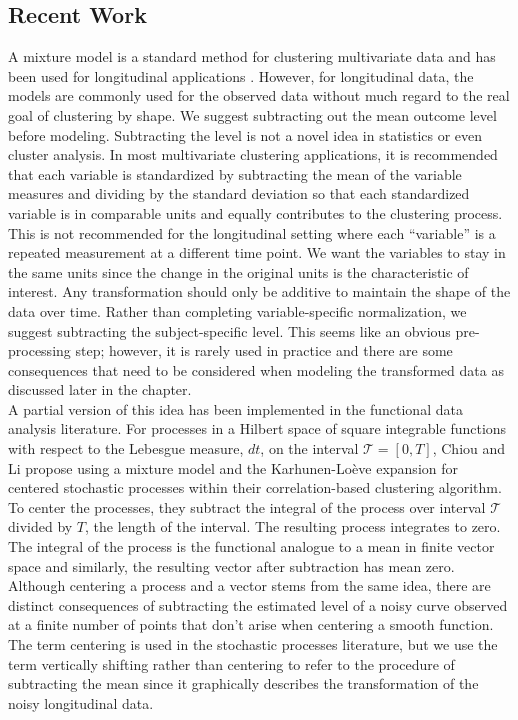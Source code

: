 \documentclass[12pt]{article}
\begin{document}
\subsection{Recent Work}
A mixture model is a standard method for clustering multivariate data \cite{everitt2009} and has been used for longitudinal applications \cite{muthen2010, jones2001}. However, for longitudinal data, the models are commonly used for the observed data without much regard to the real goal of clustering by shape. We suggest subtracting out the mean outcome level before modeling. Subtracting the level is not a novel idea in statistics or even cluster analysis. In most multivariate clustering applications, it is recommended that each variable is standardized by subtracting the mean of the variable measures and dividing by the standard deviation so that each standardized variable is in comparable units and equally contributes to the clustering process. This is not recommended for the longitudinal setting where each ``variable'' is a repeated measurement at a different time point. We want the variables to stay in the same units since the change in the original units is the characteristic of interest. Any transformation should only be additive to maintain the shape of the data over time. Rather than completing variable-specific normalization, we suggest subtracting the subject-specific level. This seems like an obvious pre-processing step; however, it is rarely used in practice and there are some consequences that need to be considered when modeling the transformed data as discussed later in the chapter. \\

A partial version of this idea has been implemented in the functional data analysis literature. For processes in a Hilbert space of square integrable functions with respect to the Lebesgue measure, $dt$, on the interval $\mathcal{T}=[0,T]$, Chiou and Li \cite{chiou2008} propose using a mixture model and the Karhunen-Lo{\`e}ve expansion for centered stochastic processes within their correlation-based clustering algorithm. To center the processes, they subtract the integral of the process over interval $\mathcal{T}$ divided by $T$, the length of the interval. The resulting process integrates to zero. The integral of the process is the functional analogue to a mean in finite vector space and similarly, the resulting vector after subtraction has mean zero.\\

 Although centering a process and a vector stems from the same idea, there are distinct consequences of subtracting the estimated level of a noisy curve observed at a finite number of points that don't arise when centering a smooth function. The term centering is used in the stochastic processes literature, but we use the term vertically shifting rather than centering to refer to the procedure of subtracting the mean since it graphically describes the transformation of the noisy longitudinal data.\\
 
\end{document}
